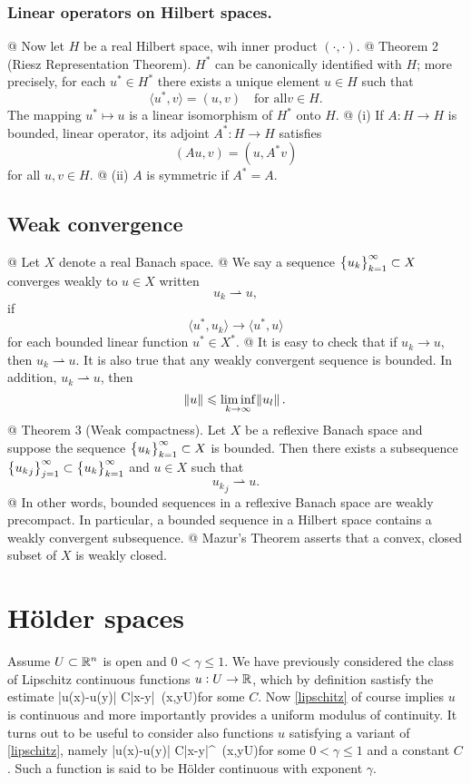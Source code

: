 \subsubsection{Linear operators on Hilbert spaces.}
\beeli
@ Now let $H$ be a real Hilbert space, wih inner product $(\cdot{,}\cdot)$.
@ Theorem 2 (Riesz Representation Theorem). $H^\ast$ can be canonically
identified with $H$; more precisely, for each $u^\ast\in H^\ast$ there exists a
unique element $u\in H$ such that $$\langle u^\ast,v\rangle=(u,v)\quad\text{for
all}v\in H.$$ The mapping $u^\ast\mapsto u$ is a linear isomorphism of $H^\ast$
onto $H$.
@ (i) If $A:H\to H$ is bounded, linear operator, its adjoint $A^\ast :H\to H$
satisfies $$(Au,v)=(u,A^\ast v)$$ for all $u,v\in H$. 
@ (ii) $A$ is symmetric if $A^\ast=A$.
\eeel
\subsection{Weak convergence}
\newcommand{\wto}{\rightharpoonup}
\beeli
@ Let $X$ denote a real Banach space.
@ We say a sequence $\big\{u_k\big\}_{k=1}^\infty\subset X$ converges weakly to $u\in X$ written
$$u_k\rightharpoonup u,$$ if
$$\langle u^\ast,u_k\rangle\to\langle u^\ast,u\rangle$$ for each bounded linear
function $u^\ast\in X^\ast$.
@ It is easy to check that if $u_k\to u$, then $u_k\rightharpoonup u$. It is
also true that any weakly convergent sequence is bounded. In addition,
$u_k\rightharpoonup u$, then $$\norm{u}\leqslant \liminf_{k\to\infty}\norm{u_l}.$$
@ Theorem 3 (Weak compactness). Let $X$ be a reflexive Banach space and suppose
the sequence $\big\{u_k\big\}_{k=1}^\infty\subset X$ is bounded. Then there exists a subsequence
$\big\{{u_k}_j\big\}_{j=1}^\infty\subset\big\{u_k\big\}_{k=1}^\infty$ and $u\in X$ such that $${u_k}_j\wto u.$$
@ In other words, bounded sequences in a reflexive Banach space are weakly
precompact. In particular, a bounded sequence in a Hilbert space contains a
weakly convergent subsequence.
@ Mazur's Theorem asserts that a convex, closed subset of $X$ is weakly closed.
\eeel


\section{H\"older spaces}
Assume $U\subset\mathbb{R}^n$ is open and $0<\gamma\leq 1.$ We have previously
considered the class of Lipschitz continuous functions $u:U\to \mathbb{R}$, which by
definition sastisfy the estimate \be\label{lipschitz}|u(x)-u(y)|\leq
C|x-y|~(x,y\in U)\ee for some $C$. Now \eqref{lipschitz} of course implies $u$
is continuous and more importantly provides a uniform modulus of continuity. It
turns out to be useful to consider also functions $u$ satisfying a variant of
\eqref{lipschitz}, namely \be\label{hoelder}|u(x)-u(y)|\leq
C|x-y|^\gamma~(x,y\in U)\ee for some $0<\gamma\leq 1$ and a constant $C$.
Such a function is said to be H\"older continuous with exponent $\gamma$.
